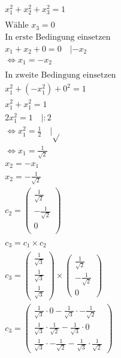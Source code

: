 \begin{align*}
    x_1^2 + x_2^2 + x_3^2 = 1 \\\\
    \text{Wähle } x_3 = 0 \\
    \text{In erste Bedingung einsetzen} \\
    x_1 + x_2 + 0 = 0 \quad | - x_2\\
    \Leftrightarrow x_1 = -x_2 \\\\
    \text{In zweite Bedingung einsetzen} \\
    x_1^2 + (- x_1^2) + 0^2 = 1 \\
    x_1^2 + x_1^2 = 1 \\
    2x_1^2 = 1 \quad | : 2\\
    \Leftrightarrow x_1^2 = \frac{1}{2} \quad | \sqrt{}\\
    \Leftrightarrow x_1 = \frac{1}{\sqrt{2}} \\
    x_2 = -x_1 \\
    x_2 = -\frac{1}{\sqrt{2}} \\
    c_2 = \begin{pmatrix}
        \frac{1}{\sqrt{2}} \\
        - \frac{1}{\sqrt{2}} \\
        0 \\
    \end{pmatrix} \\\\
    c_3 = c_1 \times c_2 \\
    c_3 = \begin{pmatrix}
        \frac{1}{\sqrt{3}} \\
        \frac{1}{\sqrt{3}} \\
        \frac{1}{\sqrt{3}} 
    \end{pmatrix} \times \begin{pmatrix}
        \frac{1}{\sqrt{2}} \\ -\frac{1}{\sqrt{2}} \\ 0
    \end{pmatrix} \\
    c_3 = \begin{pmatrix}
        \frac{1}{\sqrt{3}} \cdot 0 - \frac{1}{\sqrt{3}} \cdot -\frac{1}{\sqrt{2}} \\
        \frac{1}{\sqrt{3}} \cdot \frac{1}{\sqrt{2}} - \frac{1}{\sqrt{3}} \cdot 0 \\
        \frac{1}{\sqrt{3}} \cdot -\frac{1}{\sqrt{2}} - \frac{1}{\sqrt{3}} \cdot \frac{1}{\sqrt{2}}
    \end{pmatrix} \\

\end{align*}
